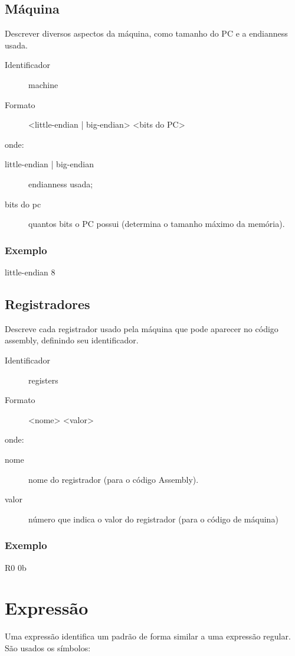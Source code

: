 \documentclass[a4paper,10pt]{article}
\begin{document}
	\subsection{Máquina}
		\label{máquina}
		Descrever diversos aspectos da máquina, como tamanho do PC e a endianness usada.
		\begin{description}
		 \item [Identificador] machine
		 \item [Formato] <little-endian | big-endian> <bits do PC>
		\end{description}
		onde:
		\begin{description}
		 \item [little-endian | big-endian] endianness usada;
		 \item [bits do pc] quantos bits o PC possui (determina o tamanho máximo da memória).
		\end{description}

		\subsubsection{Exemplo}
			little-endian 8
			
	\subsection{Registradores}
		\label{registradores}
		
		Descreve cada registrador usado pela máquina que pode aparecer no código assembly, definindo seu identificador.
		\begin{description}
		 \item [Identificador] registers
		 \item [Formato] <nome> <valor>
		\end{description}
		onde:
		\begin{description}
		 \item [nome] nome do registrador (para o código Assembly).
		 \item [valor] número que indica o valor do registrador (para o código de máquina)
		\end{description}

		\subsubsection{Exemplo}
			R0 0b
			
\section{Expressão}
\label{expressão}
Uma expressão identifica um padrão de forma similar a uma expressão regular. São usados os símbolos: 
\end{document}
